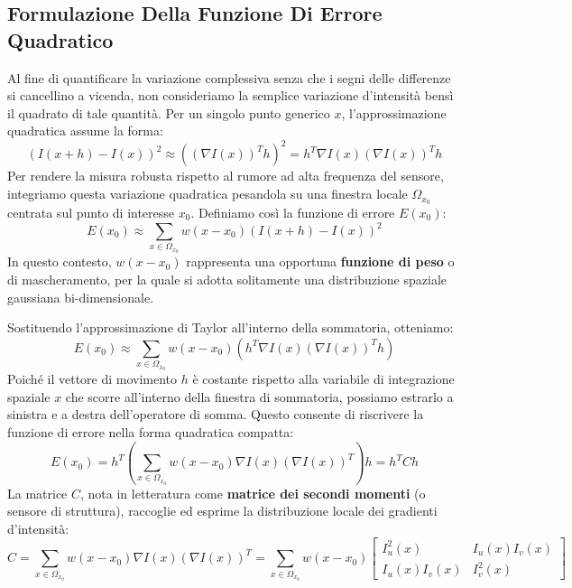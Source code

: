 ﻿\documentclass[11pt, a4paper]{article}
\begin{document}
\subsection{Formulazione Della Funzione Di Errore Quadratico}

Al fine di quantificare la variazione complessiva senza che i segni delle differenze si cancellino a vicenda, non consideriamo la semplice variazione d'intensità bensì il quadrato di tale quantità. Per un singolo punto generico $x$, l'approssimazione quadratica assume la forma:
\begin{equation}
    (I(x + h) - I(x))^2 \approx \left( (\nabla I(x))^T h \right)^2 = h^T \nabla I(x) (\nabla I(x))^T h
\end{equation}
Per rendere la misura robusta rispetto al rumore ad alta frequenza del sensore, integriamo questa variazione quadratica pesandola su una finestra locale $\Omega_{x_0}$ centrata sul punto di interesse $x_0$. Definiamo così la funzione di errore $E(x_0)$:
\begin{equation}
    E(x_0) \approx \sum_{x \in \Omega_{x_0}} w(x - x_0) (I(x + h) - I(x))^2
\end{equation}
In questo contesto, $w(x - x_0)$ rappresenta una opportuna \textbf{funzione di peso} o di mascheramento, per la quale si adotta solitamente una distribuzione spaziale gaussiana bi-dimensionale.

Sostituendo l'approssimazione di Taylor all'interno della sommatoria, otteniamo:
\begin{equation}
    E(x_0) \approx \sum_{x \in \Omega_{x_0}} w(x - x_0) \left( h^T \nabla I(x) (\nabla I(x))^T h \right)
\end{equation}
Poiché il vettore di movimento $h$ è costante rispetto alla variabile di integrazione spaziale $x$ che scorre all'interno della finestra di sommatoria, possiamo estrarlo a sinistra e a destra dell'operatore di somma. Questo consente di riscrivere la funzione di errore nella forma quadratica compatta:
\begin{equation}
    E(x_0) = h^T \left( \sum_{x \in \Omega_{x_0}} w(x - x_0) \nabla I(x) (\nabla I(x))^T \right) h = \boxed{h^T C h}
\end{equation}
La matrice $C$, nota in letteratura come \textbf{matrice dei secondi momenti} (o sensore di struttura), raccoglie ed esprime la distribuzione locale dei gradienti d'intensità:
\begin{equation}
    C = \sum_{x \in \Omega_{x_0}} w(x - x_0) \nabla I(x) (\nabla I(x))^T = \sum_{x \in \Omega_{x_0}} w(x - x_0) \begin{bmatrix} I_u^2(x) & I_u(x) I_v(x) \\ I_u(x) I_v(x) & I_v^2(x) \end{bmatrix}
\end{equation}
\end{document}

